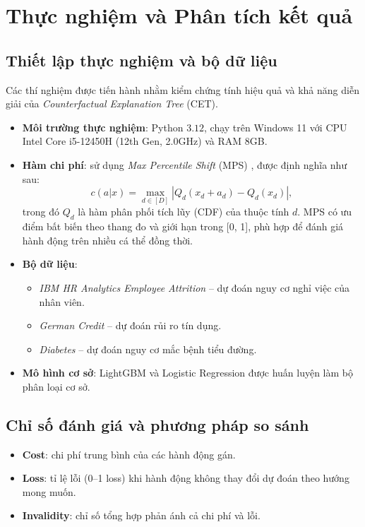 \chapter{Thực nghiệm và Phân tích kết quả}

\section{Thiết lập thực nghiệm và bộ dữ liệu}
Các thí nghiệm được tiến hành nhằm kiểm chứng tính hiệu quả và khả năng diễn giải của \textit{Counterfactual Explanation Tree} (CET). 

\begin{itemize}
    \item \textbf{Môi trường thực nghiệm}: Python $3.12$, chạy trên Windows 11 với CPU Intel Core i5-12450H (12th Gen, 2.0GHz) và RAM 8GB.
    \item \textbf{Hàm chi phí}: sử dụng \textit{Max Percentile Shift} (MPS) \parencite{Ustun_2019}, được định nghĩa như sau:
    \[
    c(a|x) = \max_{d \in [D]} \left| Q_d(x_d + a_d) - Q_d(x_d) \right|,
    \]
    trong đó $Q_d$ là hàm phân phối tích lũy (CDF) của thuộc tính $d$. MPS có ưu điểm bất biến theo thang đo và giới hạn trong [0, 1], phù hợp để đánh giá hành động trên nhiều cá thể đồng thời.
    \item \textbf{Bộ dữ liệu}: 
    \begin{itemize}
        \item \textit{IBM HR Analytics Employee Attrition} \parencite{kaggle2017ibmhr} – dự đoán nguy cơ nghỉ việc của nhân viên.
        \item \textit{German Credit} \parencite{adult_2} – dự đoán rủi ro tín dụng.
        \item \textit{Diabetes} – dự đoán nguy cơ mắc bệnh tiểu đường.
    \end{itemize}
        
    \item \textbf{Mô hình cơ sở}: LightGBM \parencite{ke2017lightgbm} và Logistic Regression được huấn luyện làm bộ phân loại cơ sở.
\end{itemize}

\section{Chỉ số đánh giá và phương pháp so sánh}
\begin{itemize}
    \item \textbf{Cost}: chi phí trung bình của các hành động gán.
    \item \textbf{Loss}: tỉ lệ lỗi (0–1 loss) khi hành động không thay đổi dự đoán theo hướng mong muốn.
    \item \textbf{Invalidity}: chỉ số tổng hợp phản ánh cả chi phí và lỗi.
\end{itemize}

